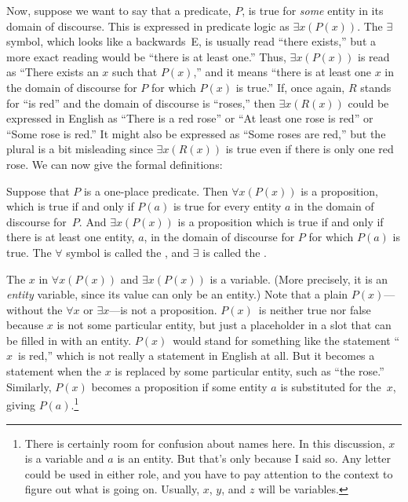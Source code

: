 Now, suppose we want to say that a predicate, $P$, is true for \emph{some}
entity in its domain of discourse.  This is expressed in predicate
logic as $\exists x(P(x))$.  The $\exists$ symbol, which looks like a
backwards~E, is usually read ``there exists,'' but a more exact reading
would be ``there is at least one.'' Thus, $\exists x(P(x))$ is read
as ``There exists an $x$ such that $P(x)$,'' and it means ``there is
at least one $x$ in the domain of discourse for $P$ for which $P(x)$
is true.''  If, once again, $R$ stands for ``is red'' and the domain
of discourse is ``roses,'' then $\exists x(R(x))$ could be expressed
in English as ``There is a red rose'' or ``At least one rose is red''
or ``Some rose is red.''  It might also be expressed as ``Some roses
are red,'' but the plural is a bit misleading since $\exists x(R(x))$
is true even if there is only one red rose.
We can now give the formal definitions:

\begin{definition}
Suppose that $P$ is a one-place predicate.  Then $\forall x(P(x))$ is
a proposition, which is true if and only if $P(a)$ is true for every
entity $a$ in the domain of discourse for~$P$.  And $\exists x(P(x))$
is a proposition which is true if and only if there is at least one
entity, $a$, in the domain of discourse for $P$ for which $P(a)$ is
true.  The $\forall$ symbol is called the ,
and $\exists$ is called the .
\end{definition}

The $x$ in $\forall x(P(x))$ and $\exists x(P(x))$ is a variable.
(More precisely, it is an \emph{entity} variable, since its value
can only be an entity.)
Note that a plain $P(x)$---without the $\forall x$ or $\exists x$---is
not a proposition.  $P(x)$~is neither true nor false because $x$
is not some particular entity, but just a placeholder in a slot that
can be filled in with an entity.  $P(x)$~would stand for
something like the statement ``$x$~is red,'' which is not really a
statement in English at all.  But it becomes a statement when
the $x$ is replaced by some particular entity, such as ``the rose.''
Similarly, $P(x)$ becomes a proposition if some entity $a$ is substituted
for the~$x$, giving $P(a)$.\footnote{There is certainly room for confusion
about names here.  In this discussion, $x$ is a variable and $a$ is 
an entity.  But that's only because I said so.  Any letter could be used
in either role, and you have to pay attention to the context to
figure out what is going on.  Usually, $x$, $y$, and $z$ will be variables.}

